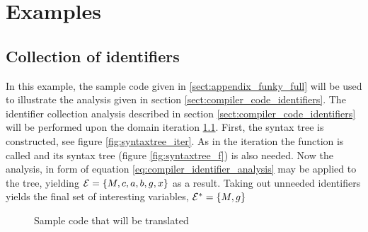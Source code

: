 
\chapter{Examples}
\section{Collection of identifiers}
\label{ex:identifiers}
In this example, the sample code given in \ref{sect:appendix_funky_full} will be used to illustrate the analysis given in section \ref{sect:compiler_code_identifiers}. The identifier collection analysis described in section \ref{sect:compiler_code_identifiers} will be performed upon the domain iteration \ref{code:example}. First, the syntax tree is constructed, see figure \ref{fig:syntaxtree_iter}. As in the iteration the function  is called and its syntax tree (figure \ref{fig:syntaxtree_f}) is also needed. Now the analysis, in form of equation \ref{eq:compiler_identifier_analysis} may be applied to the tree, yielding $\mathcal{E}=\left\{ M,c,a,b,g,x \right\}$ as a result. Taking out unneeded identifiers yields the final set of interesting variables, $\mathcal{E^*} = \left\{ M, g \right\}$\\

\begin{figure}[h]
	\centering
	
	\caption{Sample code that will be translated}
	\label{code:example}
\end{figure}


